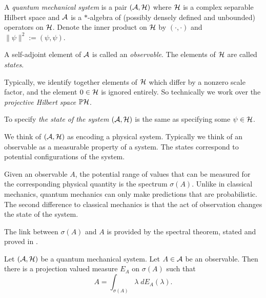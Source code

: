 \begin{definition}
    A \emph{quantum mechanical system} is a pair $(\mathcal{A},\mathcal{H})$ where $\mathcal{H}$
    is a complex separable Hilbert space and $\mathcal{A}$ is a $*$-algebra
    of (possibly densely defined and unbounded) operators on $\mathcal{H}$. 
    Denote the inner product on $\mathcal{H}$ by $(\cdot,\cdot)$
    and $\|\psi\|^2 := (\psi,\psi)$.
    
    
    A self-adjoint element of $\mathcal{A}$ is called an \emph{observable}. 
    The elements of $\mathcal{H}$ are called \emph{states}. 
    
    Typically, we identify together elements of $\mathcal{H}$
    which differ by a nonzero scale factor, and the element $0 \in \mathcal{H}$
    is ignored entirely. So technically we work over the \emph{projective
    Hilbert space} $\mathbb{P}\mathcal{H}$.
    
    To specify \emph{the state of the system} $(\mathcal{A},\mathcal{H})$ is the same
    as specifying some $\psi \in \mathcal{H}$.
\end{definition}

We think of $(\mathcal{A},\mathcal{H})$ as encoding a physical system. 
Typically we think of an observable as a measurable
property of a system. The states correspond to potential
configurations of the system.

Given an observable $A$, the potential range
of values that can be measured
for the corresponding physical quantity is the spectrum $\sigma(A)$. Unlike in classical mechanics,
quantum mechanics can only make predictions that are probabilistic.
The second difference to classical mechanics is that the act of observation changes
the state of the system.

The link
between $\sigma(A)$ and $A$ is provided by the spectral theorem, stated and proved in \cite[p.369]{rudin}.
\begin{theorem}
    Let $(\mathcal{A},\mathcal{H})$ be a quantum mechanical system. Let $A \in \mathcal{A}$ be an observable.
    Then there is a projection valued measure $E_A$ on $\sigma(A)$ such that
    \begin{equation*}
        A = \int_{\sigma(A)} \lambda\;dE_A(\lambda).
    \end{equation*}
\end{theorem}

